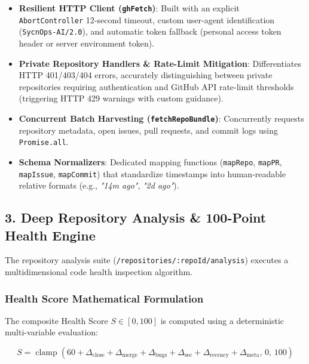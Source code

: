 \documentclass[11pt,a4paper]{article}
\begin{document}
\begin{itemize}[leftmargin=1.5em]
    \item \textbf{Resilient HTTP Client (\texttt{ghFetch})}: Built with an explicit \texttt{AbortController} 12-second timeout, custom user-agent identification (\texttt{SycnOps-AI/2.0}), and automatic token fallback (personal access token header or server environment token).
    \item \textbf{Private Repository Handlers \& Rate-Limit Mitigation}: Differentiates HTTP 401/403/404 errors, accurately distinguishing between private repositories requiring authentication and GitHub API rate-limit thresholds (triggering HTTP 429 warnings with custom guidance).
    \item \textbf{Concurrent Batch Harvesting (\texttt{fetchRepoBundle})}: Concurrently requests repository metadata, open issues, pull requests, and commit logs using \texttt{Promise.all}.
    \item \textbf{Schema Normalizers}: Dedicated mapping functions (\texttt{mapRepo}, \texttt{mapPR}, \texttt{mapIssue}, \texttt{mapCommit}) that standardize timestamps into human-readable relative formats (e.g., \textit{"14m ago"}, \textit{"2d ago"}).
\end{itemize}

\subsection{3. Deep Repository Analysis \& 100-Point Health Engine}
The repository analysis suite (\texttt{/repositories/:repoId/analysis}) executes a multidimensional code health inspection algorithm. 

\subsubsection{Health Score Mathematical Formulation}
The composite Health Score $S \in [0, 100]$ is computed using a deterministic multi-variable evaluation:

\begin{equation}
S = \operatorname{clamp}\left(60 + \Delta_{\text{close}} + \Delta_{\text{merge}} + \Delta_{\text{bugs}} + \Delta_{\text{sec}} + \Delta_{\text{recency}} + \Delta_{\text{meta}},\, 0,\, 100\right)
\end{equation}
\end{document}

